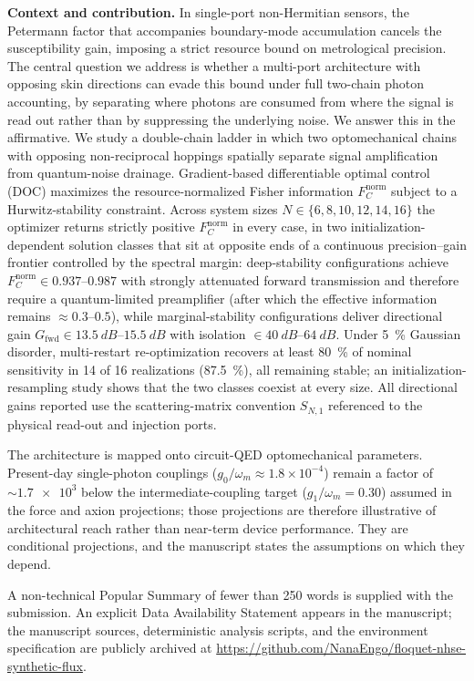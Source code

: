 \documentclass[11pt,a4paper]{article}
\newcommand{\Fnorm}{F_C^{\mathrm{norm}}}
\newcommand{\Gfwd}{G_{\mathrm{fwd}}}
\begin{document}
\textbf{Context and contribution.}
In single-port non-Hermitian sensors, the Petermann factor that accompanies boundary-mode accumulation cancels the susceptibility gain, imposing a strict resource bound on metrological precision. The central question we address is whether a multi-port architecture with opposing skin directions can evade this bound under full two-chain photon accounting, by separating where photons are consumed from where the signal is read out rather than by suppressing the underlying noise. We answer this in the affirmative. We study a double-chain ladder in which two optomechanical chains with opposing non-reciprocal hoppings spatially separate signal amplification from quantum-noise drainage. Gradient-based differentiable optimal control (DOC) maximizes the resource-normalized Fisher information $\Fnorm$ subject to a Hurwitz-stability constraint. Across system sizes $N\in\{\num{6},\num{8},\num{10},\num{12},\num{14},\num{16}\}$ the optimizer returns strictly positive $\Fnorm$ in every case, in two initialization-dependent solution classes that sit at opposite ends of a continuous precision--gain frontier controlled by the spectral margin: deep-stability configurations achieve $\Fnorm\in\numrange{0.937}{0.987}$ with strongly attenuated forward transmission and therefore require a quantum-limited preamplifier (after which the effective information remains $\approx\num{0.3}$--$\num{0.5}$), while marginal-stability configurations deliver directional gain $\Gfwd\in\qtyrange{13.5}{15.5}{\si{dB}}$ with isolation $\in\qtyrange{40}{64}{\si{dB}}$. Under \qty{5}{\percent} Gaussian disorder, multi-restart re-optimization recovers at least \qty{80}{\percent} of nominal sensitivity in 14 of 16 realizations (\qty{87.5}{\percent}), all remaining stable; an initialization-resampling study shows that the two classes coexist at every size. All directional gains reported use the scattering-matrix convention $S_{N,1}$ referenced to the physical read-out and injection ports.

The architecture is mapped onto circuit-QED optomechanical parameters. Present-day single-photon couplings ($g_0/\omega_m \approx 1.8\times 10^{-4}$) remain a factor of $\sim\num{1.7e3}$ below the intermediate-coupling target ($g_1/\omega_m = 0.30$) assumed in the force and axion projections; those projections are therefore illustrative of architectural reach rather than near-term device performance. They are conditional projections, and the manuscript states the assumptions on which they depend.

A non-technical Popular Summary of fewer than 250 words is supplied with the submission. An explicit Data Availability Statement appears in the manuscript; the manuscript sources, deterministic analysis scripts, and the environment specification are publicly archived at \url{https://github.com/NanaEngo/floquet-nhse-synthetic-flux}.
\end{document}
